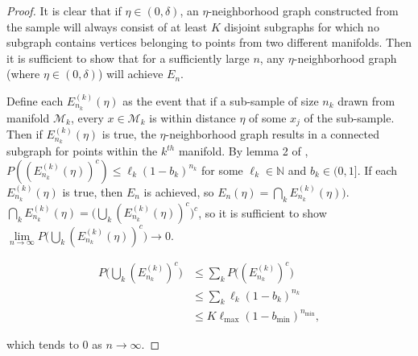 \documentclass[
  11pt,
]{article}
\theoremstyle{definition}
\theoremstyle{definition}
\theoremstyle{definition}
\theoremstyle{definition}
\theoremstyle{remark}
\begin{document}
\begin{proof}
It is clear that if $\eta \in (0, \delta)$, an $\eta$-neighborhood graph constructed from the sample will always consist of at least $K$ disjoint subgraphs for which no subgraph contains vertices belonging to points from two different manifolds. 
Then it is sufficient to show that for a sufficiently large $n$, any $\eta$-neighborhood graph (where $\eta \in (0, \delta)$) will achieve $E_n$. 

Define each $E_{n_k}^{(k)}(\eta)$ as the event that if a sub-sample of size $n_k$ drawn from manifold $\mathcal{M}_k$, every $x \in \mathcal{M}_k$ is within distance $\eta$ of some $x_j$ of the sub-sample. 
Then if $E_{n_k}^{(k)}(\eta)$ is true, the $\eta$-neighborhood graph results in a connected subgraph for points within the $k^{th}$ manifold. 
By lemma 2 of \citet{trosset2020rehabilitating}, $P((E_{n_k}^{(k)}(\eta))^c) \leq \ell_k (1 - b_k)^{n_k}$ for some $\ell_k \in \mathbb{N}$ and $b_k \in (0, 1]$. 
If each $E_{n_k}^{(k)}(\eta)$ is true, then $E_n$ is achieved, so $E_n(\eta) = \bigcap_k E_{n_k}^{(k)}(\eta))$. 
$\bigcap_k E_{n_k}^{(k)}(\eta) = \Big( \bigcup_k (E_{n_k}^{(k)}(\eta))^c \Big)^c$, so it is sufficient to show $\lim\limits_{n \to \infty} P \big( \bigcup_k (E_{n_k}^{(k)}(\eta))^c \big) \to 0$. 

$$
\begin{aligned}
P \big( \bigcup_k(E_{n_k}^{(k)})^c \big) & \leq \sum_k P \big((E_{n_k}^{(k)})^c \big) \\
& \leq \sum_k \ell_k (1 - b_k)^{n_k} \\
& \leq K \ell_{\max} (1 - b_{\min})^{n_{\min}},
\end{aligned}
$$

which tends to $0$ as $n \to \infty$. 
\end{proof}
\end{document}
